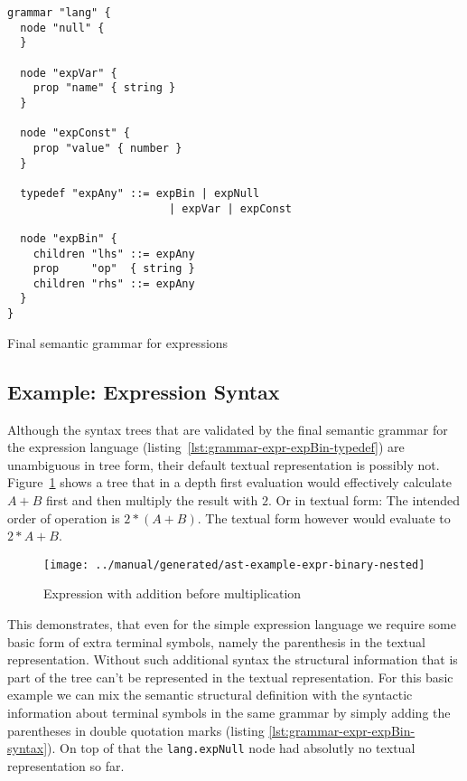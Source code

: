 \documentclass[sigconf,review=true]{acmart}
\newcommand\astScale{0.75}
\begin{document}
\begin{listing}[H]
\begin{verbatim}
grammar "lang" {
  node "null" {
  }

  node "expVar" {
    prop "name" { string }
  }

  node "expConst" {
    prop "value" { number }
  }

  typedef "expAny" ::= expBin | expNull
                         | expVar | expConst

  node "expBin" {
    children "lhs" ::= expAny
    prop     "op"  { string }
    children "rhs" ::= expAny
  }
}
\end{verbatim}
\caption{Final semantic grammar for expressions}
\label{lst:grammar-expr-expBin-typedef}
\end{listing}

\subsection{Example: Expression Syntax}

Although the syntax trees that are validated by the final semantic grammar for the expression language (listing~\ref{lst:grammar-expr-expBin-typedef}) are unambiguous in tree form, their default textual representation is possibly not. Figure~\ref{fig:ast-nested-ambiguous} shows a tree that in a depth first evaluation would effectively calculate $A+B$ first and then multiply the result with $2$. Or in textual form: The intended order of operation is $2 * (A+B)$. The textual form however would evaluate to $2 * A + B$.

\begin{figure}
  \texttt{[image: ../manual/generated/ast-example-expr-binary-nested]}
  \caption{Expression with addition before multiplication}
  \label{fig:ast-nested-ambiguous}
\end{figure}

This demonstrates, that even for the simple expression language we require some basic form of extra terminal symbols, namely the parenthesis in the textual representation. Without such additional syntax the structural information that is part of the tree can't be represented in the textual representation. For this basic example we can mix the semantic structural definition with the syntactic information about terminal symbols in the same grammar by simply adding the parentheses in double quotation marks (listing \ref{lst:grammar-expr-expBin-syntax}). On top of that the \texttt{lang.expNull} node had absolutly no textual representation so far.
\end{document}
